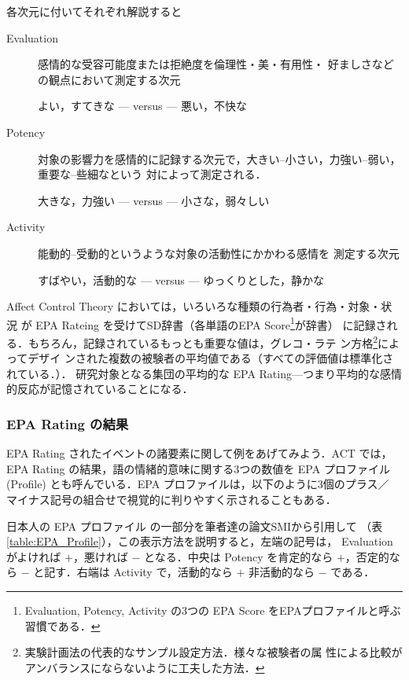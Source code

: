\documentclass[japanese]{jnlp_1.3d}
\newcommand{\citep}{}
\begin{document}
各次元に付いてそれぞれ解説すると
\begin{description}
 \item[Evaluation] 感情的な受容可能度または拒絶度を倫理性・美・有用性・
	    好ましさなどの観点において測定する次元 

	    よい，すてきな --- versus --- 悪い，不快な
 \item[Potency] 対象の影響力を感情的に記録する次元で，大きい--小さい，力強い--弱い，
	重要な--些細なという
	\pagebreak
	対によって測定される．

	    大きな，力強い --- versus --- 小さな，弱々しい
 \item[Activity] 能動的--受動的というような対象の活動性にかかわる感情を
	    測定する次元

	    すばやい，活動的な --- versus --- ゆっくりとした，静かな
\end{description}

 Affect Control Theory においては，いろいろな種類の行為者・行為・対象・状況 が EPA Rateing
 を受けてSD辞書（各単語のEPA Score\footnote{Evaluation, Potency, Activity
 の3つの EPA Score をEPAプロファイルと呼ぶ習慣である．}が辞書）
 に記録される．もちろん，記録されているもっとも重要な値は，グレコ・ラテ
 ン方格\footnote{実験計画法の代表的なサンプル設定方法．様々な被験者の属
 性による比較がアンバランスにならないように工夫した方法．}によってデザイ
 ンされた複数の被験者の平均値である（すべての評価値は標準化されている．）． 研究対象となる集団の平均的な EPA Rating—つまり平均的な感情的反応が記憶されていることになる．

    \subsubsection*{EPA Rating の結果}
EPA Rating されたイベントの諸要素に関して例をあげてみよう．ACT では，EPA
Rating の結果，語の情緒的意味に関する3つの数値を EPA プロファイル
(Profile) とも呼んでいる．EPA プロファイルは，以下のように3個のプラス／
マイナス記号の組合せで視覚的に判りやすく示されることもある．


日本人の EPA プロファイル の一部分を筆者達の論文\citep{SMI}から引用して
（表 \ref{table:EPA_Profile}），この表示方法を説明すると，左端の記号は，
Evaluation がよければ $+$，悪ければ $-$ となる．中央は Potency を肯定的なら
$+$，否定的なら $-$ と記す．右端は Activity で，活動的なら $+$ 非活動的なら $-$ である．
\end{document}
